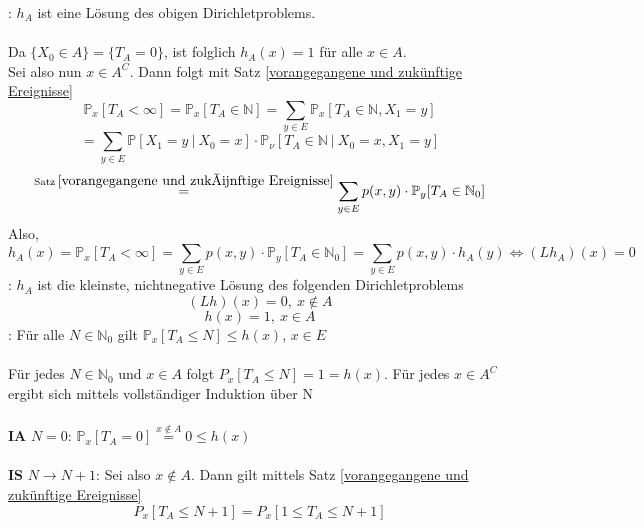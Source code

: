 : $h_{A}$ ist eine Lösung des obigen Dirichletproblems.
\\
\\
Da $\lbrace X_{0} \in A \rbrace = \lbrace T_{A} = 0 \rbrace$, ist folglich $h_{A}(x) = 1$ für alle $x \in A$.
\\
Sei also nun $x \in A^{C}$. Dann folgt mit Satz \ref{vorangegangene und zukünftige Ereignisse}
\begin{equation*}
\mathbb{P}_{x}[T_{A} < \infty] = \mathbb{P}_{x}[T_{A} \in \mathbb{N}] = \sum_{y \in E} \mathbb{P}_{x}[T_{A} \in \mathbb{N}, X_{1} = y]
\end{equation*}
\begin{equation*}
= \sum_{y \in E} \mathbb{P}[X_{1} = y \: | \: X_{0} = x] \cdot \mathbb{P}_{\nu}[T_{A} \in \mathbb{N} \: | \: X_{0} = x, X_{1} = y]
\end{equation*}
\begin{equation*}
\stackrel{\mathrm{Satz} \: \ref{vorangegangene und zukünftige Ereignisse}}{=} \sum_{y \in E} p(x,y) \cdot \mathbb{P}_{y}[T_{A} \in \mathbb{N}_{0}]
\end{equation*}
Also,
\begin{equation*}
h_{A}(x) = \mathbb{P}_{x}[T_{A} < \infty] = \sum_{y \in E} p(x,y) \cdot \mathbb{P}_{y}[T_{A} \in \mathbb{N}_{0}] = \sum_{y \in E} p(x,y) \cdot h_{A}(y) \Leftrightarrow (Lh_{A})(x) = 0
\end{equation*}
: $h_{A}$ ist die kleinste, nichtnegative Lösung des folgenden Dirichletproblems
\begin{equation*}
(Lh)(x) = 0, \: x \notin A
\end{equation*}
\begin{equation*}
h(x) = 1, \: x \in A
\end{equation*}
: Für alle $N \in \mathbb{N}_{0}$ gilt $\mathbb{P}_{x}[T_{A} \leq N] \leq h(x)$, $x \in E$
\\
\\
Für jedes $N \in \mathbb{N}_{0}$ und $x \in A$ folgt $P_{x}[T_{A} \leq N] = 1 = h(x)$. Für jedes $x \in A^{C}$ ergibt sich mittels vollständiger Induktion über N
\\
\\
\textbf{IA} $N=0$: $\mathbb{P}_{x}[T_{A} = 0] \stackrel{x \notin A}{=}0 \leq h(x)$
\\
\\
\textbf{IS} $N \to N+1$: Sei also $x \notin A$. Dann gilt mittels Satz \ref{vorangegangene und zukünftige Ereignisse}
\begin{equation*}
P_{x}[T_{A} \leq N+1] = P_{x}[1 \leq T_{A} \leq N+1]
\end{equation*}
